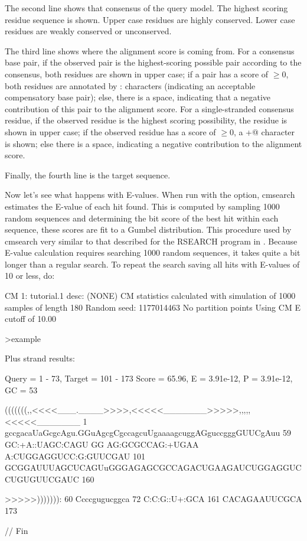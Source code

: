 The second line shows that consensus of the query model. The highest
scoring residue sequence is shown. Upper case residues are highly
conserved. Lower case residues are weakly conserved or unconserved.

The third line shows where the alignment score is coming from. For a
consensus base pair, if the observed pair is the highest-scoring
possible pair according to the consensus, both residues are shown in
upper case; if a pair has a score of $\geq 0$, both residues are
annotated by : characters (indicating an acceptable compensatory base
pair); else, there is a space, indicating that a negative contribution
of this pair to the alignment score. For a single-stranded consensus
residue, if the observed residue is the highest scoring possibility,
the residue is shown in upper case; if the observed residue has a
score of $\geq 0$, a \verb@+@ character is shown; else there is a
space, indicating a negative contribution to the alignment score.

Finally, the fourth line is the target sequence.

Now let's see what happens with E-values. When run with the 
option, cmsearch estimates the E-value of each hit found. This is
computed by sampling 1000 random sequences and determining the bit
score of the best hit within each sequence, these
scores are fit to a Gumbel distribution. This procedure used by
cmsearch very similar to that described for the RSEARCH program in
\cite{KleinEddy03}. Because E-value calculation requires searching
1000 random sequences, it takes quite a bit longer than a regular
search. To repeat the search saving all hits with E-values of 10 or
less, do:


\begin{sreoutput}
CM 1: tutorial.1
desc: (NONE)
CM statistics calculated with simulation of 1000 samples of length 180
Random seed: 1177014463
No partition points
Using CM E cutoff of 10.00

>example

  Plus strand results:

 Query = 1 - 73, Target = 101 - 173
 Score = 65.96, E = 3.91e-12, P = 3.91e-12, GC =  53

           (((((((,,<<<<___.____>>>>,<<<<<_______>>>>>,,,,,<<<<<_______
         1 gccgacaUaGcgcAgu.GGuAgcgCgccagcuUgaaaagcuggAGguccgggGUUCgAuu 59      
           GC:+A::UAGC:CAGU GG AG:GCGCCAG:+UGAA A:CUGGAGGUCC:G:GUUCGAU 
       101 GCGGAUUUAGCUCAGUuGGGAGAGCGCCAGACUGAAGAUCUGGAGGUCCUGUGUUCGAUC 160     

           >>>>>))))))):
        60 Ccccgugucggca 72      
           C:C:G::U+:GCA
       161 CACAGAAUUCGCA 173     


//
Fin

\end{sreoutput}

